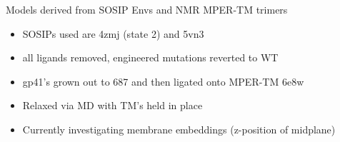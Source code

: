 \begin{frame}[fragile]{Models derived from SOSIP Envs and NMR MPER-TM trimers}
        \begin{center}
            \begin{itemize}
                \item SOSIPs used are 4zmj (state 2) and 5vn3
                \item all ligands removed, engineered mutations reverted to WT 
                \item gp41's grown out to 687 and then ligated onto MPER-TM 6e8w
                \item Relaxed via MD with TM's held in place
                \item Currently investigating membrane embeddings (z-position of midplane)
            \end{itemize}
        \end{center}
\end{frame}

